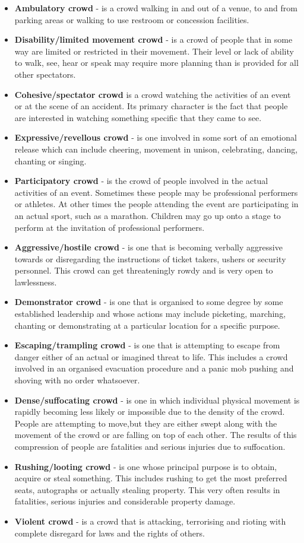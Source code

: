 \begin{itemize}
\item \textbf{Ambulatory crowd} - is a crowd walking in and out of a venue, to and from parking areas or walking to use restroom or concession facilities.
\item \textbf{Disability/limited movement crowd} - is a crowd of people that in some way are limited or restricted in their movement. Their level or lack of ability to walk, see, hear or speak may require more planning than is provided for all other spectators.
\item \textbf{Cohesive/spectator crowd} is a crowd watching the activities of an event or at the scene of an accident. Its primary character is the fact that people are interested in watching something specific that they came to see.
\item \textbf{Expressive/revellous crowd} - is one involved in some sort of an emotional release which can include cheering, movement in unison, celebrating, dancing, chanting or singing.
\item \textbf{Participatory crowd} - is the crowd of people involved in the actual activities of an event. Sometimes these people may be professional performers or athletes. At other times the people attending the event are participating in an actual sport, such as a marathon. Children may go up onto a stage to perform at the invitation of professional performers.
\item \textbf{Aggressive/hostile crowd} - is one that is becoming verbally aggressive towards or disregarding the instructions of ticket takers, ushers or security personnel. This crowd can get threateningly rowdy and is very open to lawlessness.
\item \textbf{Demonstrator crowd} - is one that is organised to some degree by some established leadership and whose actions may include picketing, marching, chanting or demonstrating at a particular location for a specific purpose.
\item \textbf{Escaping/trampling crowd} - is one that is attempting to escape from danger either of an actual or imagined threat to life. This includes a crowd involved in an organised evacuation procedure and a panic mob pushing and shoving with no order whatsoever.
\item \textbf{Dense/suffocating crowd} - is one in which individual physical movement is rapidly becoming less likely or impossible due to the density of the crowd. People are attempting to move,but they are either swept along with the movement of the crowd or are falling on top of each other. The results of this compression of people are fatalities and serious injuries due to suffocation.
\item \textbf{Rushing/looting crowd} - is one whose principal purpose is to obtain, acquire or steal something. This includes rushing to get the most preferred seats, autographs or actually stealing property. This very often results in fatalities, serious injuries and considerable property damage.
\item \textbf{Violent crowd} - is a crowd that is attacking, terrorising and rioting with complete disregard for laws and the rights of others.
\end{itemize}


